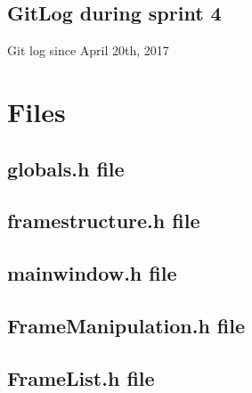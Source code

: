 \documentclass[11pt]{article} %
\begin{document}
{\newpage
\subsection{GitLog during sprint 4}
Git log since April 20th, 2017



\newpage
\section{Files}
%

\subsection{globals.h file}


\newpage
\subsection{framestructure.h file}


\newpage
\subsection{mainwindow.h file}



\newpage
\subsection{FrameManipulation.h file}

%

\newpage
\subsection{FrameList.h file}

%

}
\end{document}
